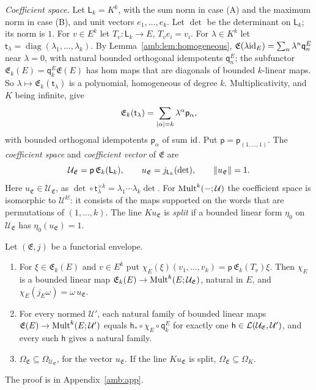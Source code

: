 \begin{definition}
\emph{Coefficient space.} Let $\mathsf L_k=K^k$, with the sum norm in case (A) and the maximum norm in case (B), and unit vectors $e_1,\dots,e_k$. Let $\det$ be the determinant on $\mathsf L_k$; its norm is $1$. For $v\in E^k$ let $T_v\colon\mathsf L_k\to E$, $T_ve_i=v_i$. For $\lambda\in K^k$ let $\mathsf t_\lambda=\operatorname{diag}(\lambda_1,\dots,\lambda_k)$. By Lemma~\ref{amb:lem:homogeneous}, $\mathfrak E(\lambda\mathrm{id}_E)=\sum_n\lambda^n\mathsf q_n^E$ near $\lambda=0$, with natural bounded orthogonal idempotents $\mathsf q_n^E$; the subfunctor $\mathfrak E_k(E)=\mathsf q_k^E\mathfrak E(E)$ has hom maps that are diagonals of bounded $k$-linear maps. So $\lambda\mapsto\mathfrak E_k(\mathsf t_\lambda)$ is a polynomial, homogeneous of degree $k$. Multiplicativity, and $K$ being infinite, give
\[
 \mathfrak E_k(\mathsf t_\lambda)=\sum_{\lvert \alpha\rvert=k}\lambda^\alpha\mathsf p_\alpha,
\]
with bounded orthogonal idempotents $\mathsf p_\alpha$ of sum $\mathrm{id}$. Put $\mathsf p=\mathsf p_{(1,\dots,1)}$. The \emph{coefficient space} and \emph{coefficient vector} of $\mathfrak E$ are
\[
 \mathcal U_{\mathfrak E}=\mathsf p\,\mathfrak E_k(\mathsf L_k),\qquad u_{\mathfrak E}=j_{\mathsf L_k}(\det),\qquad\lVert u_{\mathfrak E}\rVert=1.
\]
Here $u_{\mathfrak E}\in\mathcal U_{\mathfrak E}$, as $\det\circ\mathsf t_\lambda^{\times k}=\lambda_1\cdots\lambda_k\det$. For $\operatorname{Mult}^k(-;\mathcal U)$ the coefficient space is isomorphic to $\mathcal U^{k!}$: it consists of the maps supported on the words that are permutations of $(1,\dots,k)$. The line $Ku_{\mathfrak E}$ is \emph{split} if a bounded linear form $\eta_0$ on $\mathcal U_{\mathfrak E}$ has $\eta_0(u_{\mathfrak E})=1$.
\end{definition}

\begin{theorem}[comparison]\label{amb:thm:comparison}
Let $(\mathfrak E,j)$ be a functorial envelope.
\begin{enumerate}
\item For $\xi\in\mathfrak E_k(E)$ and $v\in E^k$ put $\chi_E(\xi)(v_1,\dots,v_k)=\mathsf p\,\mathfrak E_k(T_v)\xi$. Then $\chi_E$ is a bounded linear map $\mathfrak E_k(E)\to\operatorname{Mult}^k(E;\mathcal U_{\mathfrak E})$, natural in $E$, and $\chi_E(j_E\omega)=\omega\,u_{\mathfrak E}$.
\item For every normed $\mathcal U'$, each natural family of bounded linear maps $\mathfrak E(E)\to\operatorname{Mult}^k(E;\mathcal U')$ equals $\mathsf h_*\circ\chi_E\circ\mathsf q_k^E$ for exactly one $\mathsf h\in\mathcal L(\mathcal U_{\mathfrak E},\mathcal U')$, and every such $\mathsf h$ gives a natural family.
\item $\Omega_{\mathfrak E}\subseteq\Omega_{\mathcal U_{\mathfrak E}}$, for the vector $u_{\mathfrak E}$. If the line $Ku_{\mathfrak E}$ is split, $\Omega_{\mathfrak E}\subseteq\Omega_K$.
\end{enumerate}
\end{theorem}
The proof is in Appendix~\ref{amb:app}.

